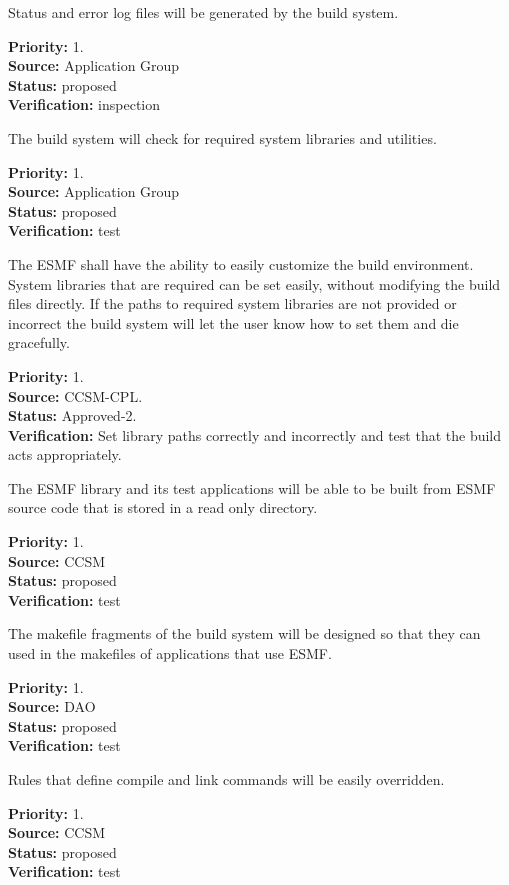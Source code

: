 Status and error log files will be generated by 
the build system.
\begin{reqlist}
{\bf Priority:} 1. \\
{\bf Source:} Application Group \\
{\bf Status:} proposed \\
{\bf Verification:} inspection
\end{reqlist}

The build system will check for required system 
libraries and utilities.
\begin{reqlist}
{\bf Priority:} 1. \\
{\bf Source:} Application Group \\
{\bf Status:} proposed \\
{\bf Verification:} test
\end{reqlist}

The ESMF shall have the ability to easily customize the build environment. 
System libraries that are required can be set easily, without modifying 
the build files directly. If the paths to required system libraries 
are not provided or incorrect the build system will let the user know 
how to set them and die gracefully.
\begin{reqlist}
{\bf Priority:} 1. \\
{\bf Source:} CCSM-CPL. \\
{\bf Status:} Approved-2. \\
{\bf Verification:} Set library paths correctly and incorrectly and test that 
the build acts appropriately.
\end{reqlist}

The ESMF library and its test applications
will be able to be built from ESMF
source code that is stored in a
read only directory.

\begin{reqlist}
{\bf Priority:} 1. \\
{\bf Source:} CCSM \\
{\bf Status:} proposed \\
{\bf Verification:} test
\end{reqlist}

The makefile fragments of the build system will 
be designed so that they can used in the makefiles 
of applications that use ESMF.

\begin{reqlist}
{\bf Priority:} 1. \\
{\bf Source:} DAO \\
{\bf Status:} proposed \\
{\bf Verification:} test
\end{reqlist}

Rules that define compile and link commands will be
easily overridden.

\begin{reqlist}
{\bf Priority:} 1. \\
{\bf Source:} CCSM \\
{\bf Status:} proposed \\
{\bf Verification:} test
\end{reqlist}


